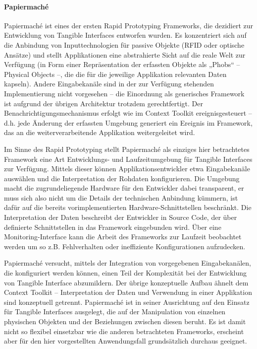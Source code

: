 \paragraph{Papiermaché} %
\label{par:papiermaché}
Papiermaché \citep{Klemmer04} ist eines der ersten Rapid Prototyping Frameworks, die dezidiert zur Entwicklung von Tangible Interfaces entworfen wurden. Es konzentriert sich auf die Anbindung von Inputtechnologien für passive Objekte (RFID oder optische Ansätze) und stellt Applikationen eine abstrahierte Sicht auf die reale Welt zur Verfügung (in Form einer Repräsentation der erfassten Objekte als „Phobs“ -- Physical Objects --, die die für die jeweilige Applikation relevanten Daten kapseln). Andere Eingabekanäle sind in der zur Verfügung stehenden Implementierung nicht vorgesehen -- die Einordnung als generisches Framework ist aufgrund der übrigen Architektur trotzdem gerechtfertigt. Der Benachrichtigungsmechanismus erfolgt wie im Context Toolkit ereignisgesteuert -- d.h. jede Änderung der erfassten Umgebung generiert ein Ereignis im Framework, das an die weiterverarbeitende Applikation weitergeleitet wird.

Im Sinne des Rapid Prototyping stellt Papiermaché als einziges hier betrachtetes Framework eine Art Entwicklungs- und Laufzeitumgebung für Tangible Interfaces zur Verfügung. Mittels dieser können Applikationsentwickler etwa Eingabekanäle auswählen und die Interpretation der Rohdaten konfigurieren. Die Umgebung macht die zugrundeliegende Hardware für den Entwickler dabei transparent, er muss sich also nicht um die Details der technischen Anbindung kümmern, ist dafür auf die bereits vorimplementierten Hardware-Schnittstellen beschränkt. Die Interpretation der Daten beschreibt der Entwickler in Source Code, der über definierte Schnittstellen in das Framework eingebunden wird. Über eine Monitoring-Interface kann die Arbeit des Frameworks zur Laufzeit beobachtet werden um so z.B. Fehlverhalten oder ineffiziente Konfigurationen aufzudecken.

Papiermaché versucht, mittels der Integration von vorgegebenen Eingabekanälen, die konfiguriert werden können, einen Teil der Komplexität bei der Entwicklung von Tangible Interface abzumildern. Der übrige konzeptuelle Aufbau ähnelt dem Context Toolkit -- Interpretation der Daten und Verwendung in einer Applikation sind konzeptuell getrennt. Papiermaché ist in seiner Ausrichtung auf den Einsatz für Tangible Interfaces ausgelegt, die auf der Manipulation von einzelnen physischen Objekten und der Beziehungen zwischen diesen beruht. Es ist damit nicht so flexibel einsetzbar wie die anderen betrachteten Frameworks, erscheint aber für den hier vorgestellten Anwendungsfall grundsätzlich durchaus geeignet.

